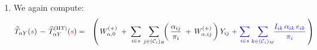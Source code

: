 \begin{enumerate}
\begin{eqnarray*}
{                \alpha_{ij} %
                }{
                \pi_{i}
                }
            \; + \;
            \underset{m \in {\color{black}s}}{\sum}\;
            \underset{n \in (\mathcal{C}_{m})_{M}}{\sum}
            \dfrac{
                \alpha_{mn}\,\varphi_{{\color{red}ij},{\color{black}mn}} %
                }{
                \pi_{m}
                }
            \,\right)
        Y_{ij}
        {\color{blue}
        \;\; + \;\;
        \underset{i \in {\color{black}s}}{\sum}\,
        \underset{k \in (\mathcal{C}_{i})_{M}}{\sum}\!
        \dfrac{I_{ik}\,\alpha_{ik}\,e_{ik}}{\pi_{i}}
        }
    \\
    & = &
        W^{(+)}_{\alpha,0}
        \;\, + \;\,
        \underset{i \in {\color{black}s}}{\sum}\;
        \underset{j \in (\mathcal{C}_{i})_{R}}{\sum}\!\!
        \left(\,
            \dfrac{
                \alpha_{ij} %
                }{
                \pi_{i}
                }
            \; + \,
            W^{(+)}_{\alpha,ij}
            \,\right)
        Y_{ij}
        {\color{blue}
        \;\; + \;\;
        \underset{i \in {\color{black}s}}{\sum}\,
        \underset{k \in (\mathcal{C}_{i})_{M}}{\sum}\!
        \dfrac{I_{ik}\,\alpha_{ik}\,e_{ik}}{\pi_{i}}
        }
    \end{eqnarray*}
\item
    We again compute:
    \begin{eqnarray*}
    \widetilde{T}_{\alpha Y}({\color{red}s})
    \, - \,
    \widehat{T}^{\HT}_{\alpha Y}({\color{red}s})
    & = &
        \left(\,
            W^{(+)}_{\alpha,0}
            \; + \;
            \underset{i \in {\color{black}s}}{\sum}\;
            \underset{j \in (\mathcal{C}_{i})_{R}}{\sum}\!\!
            \left(\,
                \dfrac{
                    \alpha_{ij} %
                    }{
                    \pi_{i}
                    }
                \; + \,
                W^{(+)}_{\alpha,ij}
                \,\right)
            Y_{ij}
            {\color{blue}
            \; + \;
            \underset{i \in {\color{black}s}}{\sum}\,
            \underset{k \in (\mathcal{C}_{i})_{M}}{\sum}\!
            \dfrac{I_{ik}\,\alpha_{ik}\,e_{ik}}{\pi_{i}}
            }
            \,\right)

\end{eqnarray*}
\end{enumerate}
